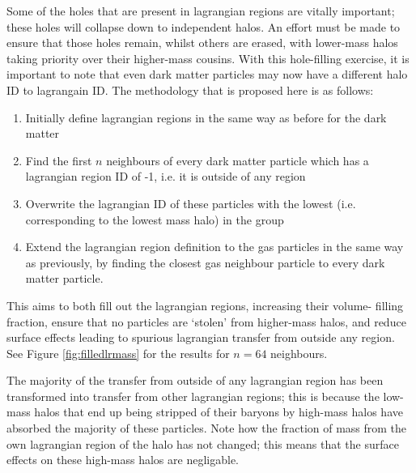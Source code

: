 Some of the holes that are present in lagrangian regions are vitally important;
these holes will collapse down to independent halos. An effort must be made to
ensure that those holes remain, whilst others are erased, with lower-mass halos
taking priority over their higher-mass cousins. With this hole-filling
exercise, it is important to note that even dark matter particles may now have
a different halo ID to lagrangain ID. The methodology that is proposed here is
as follows:
\begin{enumerate}
    \item Initially define lagrangian regions in the same way as before for
          the dark matter
    \item Find the first $n$ neighbours of every dark matter particle which
          has a lagrangian region ID of -1, i.e. it is outside of any region
    \item Overwrite the lagrangian ID of these particles with the lowest (i.e.
          corresponding to the lowest mass halo) in the group
    \item Extend the lagrangian region definition to the gas particles in
          the same way as previously, by finding the closest gas neighbour
	  particle to every dark matter particle.
\end{enumerate}
This aims to both fill out the lagrangian regions, increasing their volume-
filling fraction, ensure that no particles are `stolen' from higher-mass
halos, and reduce surface effects leading to spurious lagrangian transfer
from outside any region. See Figure \ref{fig:filledlrmass} for the results
for $n=64$ neighbours.

The majority of the transfer from outside of any lagrangian region has been
transformed into transfer from other lagrangian regions; this is because the
low-mass halos that end up being stripped of their baryons by high-mass halos
have absorbed the majority of these particles. Note how the fraction of mass
from the own lagrangian region of the halo has not changed; this means that the
surface effects on these high-mass halos are negligable.
